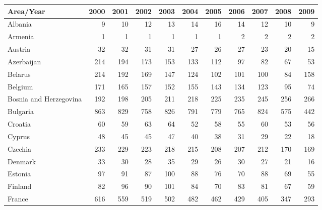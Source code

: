 \begin{table}
 \scriptsize
 \centering
 \begin{tabular}{|l|r|r|r|r|r|r|r|r|r|r|}
 \hline
                     Area/Year&   2000&   2001&   2002&   2003&   2004&   2005&   2006&   2007&   2008&   2009\\\hline\hline
                       Albania&      9&     10&     12&     13&     14&     16&     14&     12&     10&      9\\\hline
                       Armenia&      1&      1&      1&      1&      1&      1&      2&      2&      2&      2\\\hline
                       Austria&     32&     32&     31&     31&     27&     26&     27&     23&     20&     15\\\hline
                    Azerbaijan&    214&    194&    173&    153&    133&    112&     97&     82&     67&     53\\\hline
                       Belarus&    214&    192&    169&    147&    124&    102&    101&    100&     84&    158\\\hline
                       Belgium&    171&    165&    157&    152&    155&    143&    134&    123&     95&     74\\\hline
        Bosnia and Herzegovina&    192&    198&    205&    211&    218&    225&    235&    245&    256&    266\\\hline
                      Bulgaria&    863&    829&    758&    826&    791&    779&    765&    824&    575&    442\\\hline
                       Croatia&     60&     59&     63&     64&     52&     58&     55&     60&     53&     56\\\hline
                        Cyprus&     48&     45&     45&     47&     40&     38&     31&     29&     22&     18\\\hline
                       Czechia&    233&    229&    223&    218&    215&    208&    207&    212&    170&    169\\\hline
                       Denmark&     33&     30&     28&     35&     29&     26&     30&     27&     21&     16\\\hline
                       Estonia&     97&     91&     87&    100&     88&     76&     70&     88&     69&     55\\\hline
                       Finland&     82&     96&     90&    101&     84&     70&     83&     81&     67&     59\\\hline
                        France&    616&    559&    519&    502&    482&    462&    429&    405&    347&    293\\\hline

\end{tabular}
\end{table}
